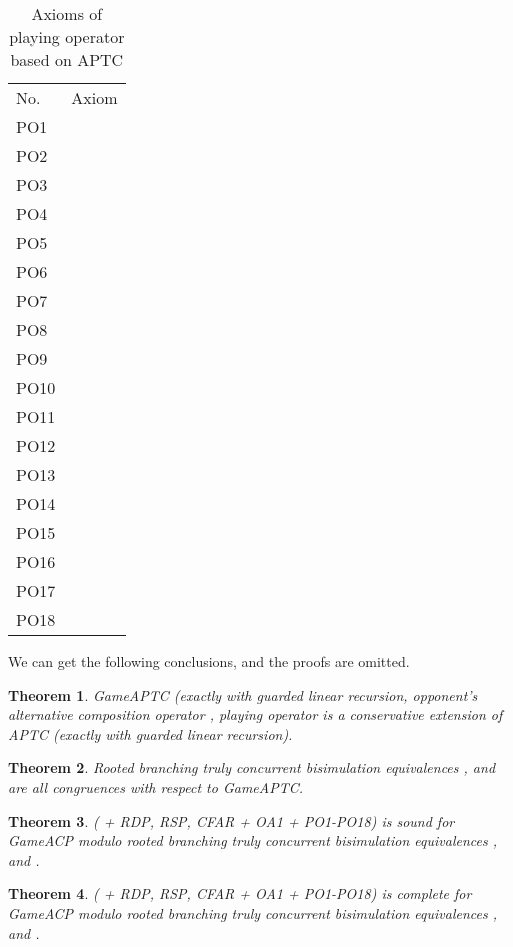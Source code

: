 \documentclass{fac}
\newtheorem{theorem}{Theorem}[section]
\begin{document}
\begin{center}
\begin{table}
  \begin{tabular}{@{}ll@{}}
  \hline No. &Axiom\\
  PO1 &  \\
  PO2 &  \\
  PO3 &  \\
  PO4 &  \\
  PO5 &  \\
  PO6 & \\
  PO7 & \\
  PO8 & \\
  PO9 & \\
  PO10 & \\
  PO11 & \\
  PO12 & \\
  PO13 & \\
  PO14 & \\
  PO15 & \\
  PO16 & \\
  PO17 & \\
  PO18 & \\
\end{tabular}
\caption{Axioms of playing operator based on APTC}
\label{AxiomOfPOAPTC}
\end{table}
\end{center}

We can get the following conclusions, and the proofs are omitted.

\begin{theorem}
GameAPTC (exactly  with guarded linear recursion, opponent's alternative composition operator , playing operator  is a conservative extension of APTC (exactly  with guarded linear recursion).
\end{theorem}

\begin{theorem}
Rooted branching truly concurrent bisimulation equivalences ,  and  are all congruences with respect to GameAPTC.
\end{theorem}

\begin{theorem}
 ( + RDP, RSP, CFAR + OA1 + PO1-PO18) is sound for GameACP modulo rooted branching truly concurrent bisimulation equivalences ,  and .
\end{theorem}

\begin{theorem}
 ( + RDP, RSP, CFAR + OA1 + PO1-PO18) is complete for GameACP modulo rooted branching truly concurrent bisimulation equivalences ,  and .
\end{theorem}
\end{document}
